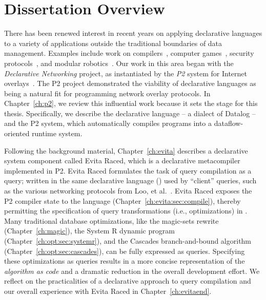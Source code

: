 \chapter[Dissertation Overview]{Dissertation Overview}
\label{ch:overview}

There has been renewed interest in recent years on applying declarative
languages to a variety of applications outside the traditional boundaries of
data management.  Examples include work on compilers~\cite{lam05context},
computer games~\cite{white-sigmod07}, security protocols~\cite{li-padl03}, and
modular robotics~\cite{ashley-iros07}.  Our work in this area began with the
{\em Declarative Networking} project, as instantiated by the {\em P2} system
for Internet overlays~\cite{p2:sosp, loo-sigmod06}.  The P2 project
demonstrated the viability of declarative languages as being a natural fit for
programming network overlay protocols.  In Chapter~\ref{ch:p2}, we review this
influential work because it sets the stage for this thesis.  Specifically, we
describe the declarative language \OVERLOG -- a dialect of Datalog -- and the
P2 system, which automatically compiles \OVERLOG programs into a
dataflow-oriented runtime system.

Following the background material, Chapter~\ref{ch:evita} describes a
declarative system component called Evita Raced, which is a declarative
metacompiler implemented in P2.  Evita Raced formulates the task of query
compilation as a query; written in the same declarative language (\OVERLOG)
used by ``client'' queries, such as the various networking protocols from Loo,
et al.~\cite{loo-sigmod06, p2:sosp}.  Evita Raced exposes the P2 compiler state
to the \OVERLOG language (Chapter~\ref{ch:evita:sec:compile}), thereby
permitting the specification of query transformations (i.e., optimizations) in
\OVERLOG.  Many traditional database optimizations, like the magic-sets rewrite
(Chapter~\ref{ch:magic}), the System R dynamic program
(Chapter~\ref{ch:opt:sec:systemr}), and the Cascades branch-and-bound algorithm
(Chapter~\ref{ch:opt:sec:cascades}), can be fully expressed as \OVERLOG
queries.  Specifying these optimizations as \OVERLOG queries results in a more
concise representation of the {\em algorithm as code} and a dramatic reduction
in the overall development effort.  We reflect on the practicalities of a
declarative approach to query compilation and our overall experience with Evita
Raced in Chapter~\ref{ch:evitaend}.
 
